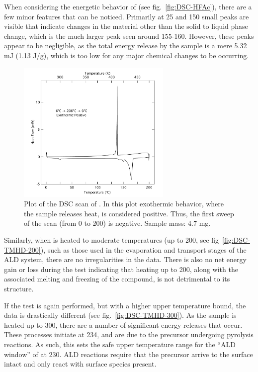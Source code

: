 When considering the energetic behavior of \HFAc{} (see fig.~\vref{fig:DSC-HFAc}), there are a few minor features that can be noticed. Primarily at 25 and 150\degC{} small peaks are visible that indicate changes in the material other than the solid to liquid phase change, which is the much larger peak seen around 155-160\degC{}. However, these peaks appear to be negligible, as the total energy release by the sample is a mere 5.32 mJ (1.13 J/g), which is too low for any major chemical changes to be occurring. 

\begin{figure}[htb]
	\centering
	\includegraphics[width=0.66\textwidth]{./Figures/Data/Thermal-Analysis/DSC/HFAc}
	\caption[DSC Results of \HFAc{}]%
		{Plot of the DSC scan of \HFAc{}. In this plot exothermic behavior, where the sample releases heat, is %
		considered positive. Thus, the first sweep of the scan (from 0\degC{} to 200\degC{}) is negative. %
		Sample mass: 4.7 mg.}
	\label{fig:DSC-HFAc}
\end{figure}

Similarly, when \TMHD{} is heated to moderate temperatures (up to 200\degC{}, see fig~\vref{fig:DSC-TMHD-200}), such as those used in the evaporation and transport stages of the ALD system, there are no irregularities in the data. There is also no net energy gain or loss during the test indicating that heating up to 200\degC{}, along with the associated melting and freezing of the compound, is not detrimental to its structure. 

If the test is again performed, but with a higher upper temperature bound, the data is drastically different (see fig.~\vref{fig:DSC-TMHD-300}). As the sample is heated up to 300\degC{}, there are a number of significant energy releases that occur. These processes initiate at 234\degC{}, and are due to the precursor undergoing pyrolysis reactions. As such, this sets the safe upper temperature range for the ``ALD window'' of \TMHD{} at 230\degC{}. ALD reactions require that the precursor arrive to the surface intact and only react with surface species present. 

